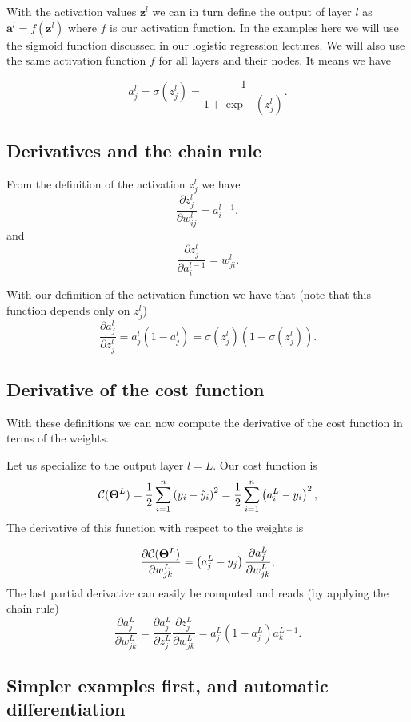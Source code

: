 \documentclass[%
oneside,                 %
final,                   %
10pt]{article}
\begin{document}
With the activation values $\bm{z}^l$ we can in turn define the
output of layer $l$ as $\bm{a}^l = f(\bm{z}^l)$ where $f$ is our
activation function. In the examples here we will use the sigmoid
function discussed in our logistic regression lectures. We will also use the same activation function $f$ for all layers
and their nodes.  It means we have

\[
a_j^l = \sigma(z_j^l) = \frac{1}{1+\exp{-(z_j^l)}}.
\]

\subsection{Derivatives and the chain rule}

From the definition of the activation $z_j^l$ we have
\[
\frac{\partial z_j^l}{\partial w_{ij}^l} = a_i^{l-1},
\]
and
\[
\frac{\partial z_j^l}{\partial a_i^{l-1}} = w_{ji}^l. 
\]

With our definition of the activation function we have that (note that this function depends only on $z_j^l$)
\[
\frac{\partial a_j^l}{\partial z_j^{l}} = a_j^l(1-a_j^l)=\sigma(z_j^l)(1-\sigma(z_j^l)). 
\]

\subsection{Derivative of the cost function}

With these definitions we can now compute the derivative of the cost function in terms of the weights.

Let us specialize to the output layer $l=L$. Our cost function is
\[
{\cal C}(\bm{\Theta}^L)  =  \frac{1}{2}\sum_{i=1}^n\left(y_i - \tilde{y}_i\right)^2=\frac{1}{2}\sum_{i=1}^n\left(a_i^L - y_i\right)^2, 
\]
The derivative of this function with respect to the weights is

\[
\frac{\partial{\cal C}(\bm{\Theta}^L)}{\partial w_{jk}^L}  =  \left(a_j^L - y_j\right)\frac{\partial a_j^L}{\partial w_{jk}^{L}}, 
\]
The last partial derivative can easily be computed and reads (by applying the chain rule)
\[
\frac{\partial a_j^L}{\partial w_{jk}^{L}} = \frac{\partial a_j^L}{\partial z_{j}^{L}}\frac{\partial z_j^L}{\partial w_{jk}^{L}}=a_j^L(1-a_j^L)a_k^{L-1}.  
\]

\subsection{Simpler examples first, and automatic differentiation}
\end{document}
